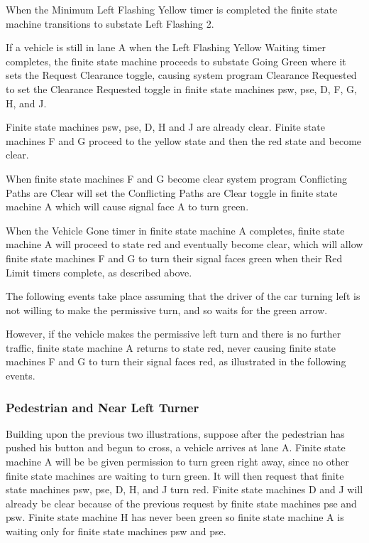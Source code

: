 \documentclass[letterpaper,twoside]{article}
\begin{document}
When the Minimum Left Flashing Yellow timer is completed the finite
state machine transitions to substate Left Flashing 2.

If a vehicle is still in lane A when the Left Flashing Yellow Waiting
timer completes, the finite state machine proceeds to substate
Going Green where it sets the Request Clearance toggle,
causing system program Clearance Requested to set the Clearance Requested
toggle in finite state machines psw, pse, D, F, G, H, and J.

Finite state machines psw, pse, D, H and J are already clear.
Finite state machines F and G proceed to the yellow state
and then the red state and become clear.

When finite state machines F and G become clear system program
Conflicting Paths are Clear will set the Conflicting Paths are Clear
toggle in finite state machine A which will cause signal face A to turn green.

When the Vehicle Gone timer in finite state machine A
completes, finite state machine A will proceed to state red and eventually
become clear, which will allow finite state machines F and G to turn
their signal faces green when their Red Limit timers complete,
as described above.

The following events take place assuming that the driver of the
car turning left is not willing to make the permissive turn,
and so waits for the green arrow.



However, if the vehicle makes the permissive left turn and there is
no further traffic, finite state machine A
returns to state red, never causing finite state machines F and G to turn
their signal faces red, as illustrated in the following events.



\subsubsection{Pedestrian and Near Left Turner}

Building upon the previous two illustrations, suppose after the pedestrian
has pushed his button and begun to cross, a vehicle arrives at lane A.
Finite state machine A will be be given permission to turn green right away,
since no other finite state machines are waiting to turn green.
It will then request that finite state machines psw, pse, D, H, and J
turn red.  Finite state machines D and J
will already be clear because of the previous request by finite state
machines pse and psw.
Finite state machine H has never been green so finite state machine A
is waiting only for finite state machines psw and pse.
\end{document}
